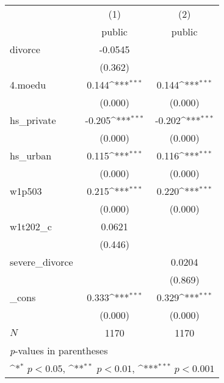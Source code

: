 {
\def\sym#1{\ifmmode^{#1}\else\(^{#1}\)\fi}
\begin{tabular}{l*{2}{c}}
\hline\hline
            &\multicolumn{1}{c}{(1)}&\multicolumn{1}{c}{(2)}\\
            &\multicolumn{1}{c}{public}&\multicolumn{1}{c}{public}\\
\hline
divorce     &     -0.0545         &                     \\
            &     (0.362)         &                     \\
[1em]
4.moedu     &       0.144\sym{***}&       0.144\sym{***}\\
            &     (0.000)         &     (0.000)         \\
[1em]
hs\_private  &      -0.205\sym{***}&      -0.202\sym{***}\\
            &     (0.000)         &     (0.000)         \\
[1em]
hs\_urban    &       0.115\sym{***}&       0.116\sym{***}\\
            &     (0.000)         &     (0.000)         \\
[1em]
w1p503      &       0.215\sym{***}&       0.220\sym{***}\\
            &     (0.000)         &     (0.000)         \\
[1em]
w1t202\_c    &      0.0621         &                     \\
            &     (0.446)         &                     \\
[1em]
severe\_divorce&                     &      0.0204         \\
            &                     &     (0.869)         \\
[1em]
\_cons      &       0.333\sym{***}&       0.329\sym{***}\\
            &     (0.000)         &     (0.000)         \\
\hline
\(N\)       &        1170         &        1170         \\
\hline\hline
\multicolumn{3}{l}{\footnotesize \textit{p}-values in parentheses}\\
\multicolumn{3}{l}{\footnotesize \sym{*} \(p<0.05\), \sym{**} \(p<0.01\), \sym{***} \(p<0.001\)}\\
\end{tabular}
}
